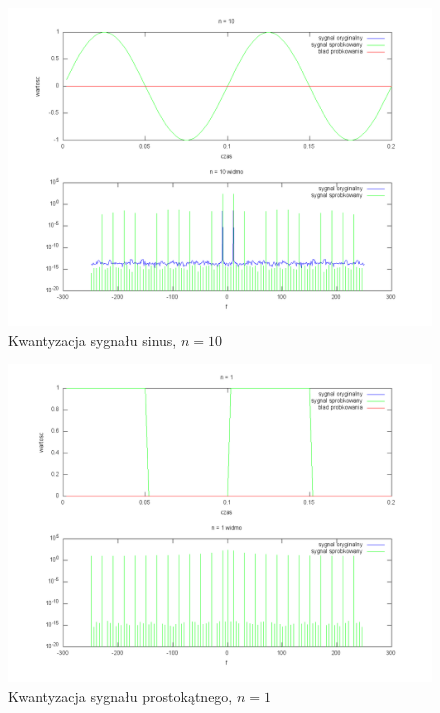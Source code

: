 \documentclass[wide,a4paper,titlepage,12pt]{mwart}
\begin{document}
	\begin{landscape}
	  \begin{figure}[htbp]
	    \begin{center}
	      \includegraphics[scale=.5]{out/kwant1-10.png}
	      \caption{\label{kwant1-10} Kwantyzacja sygnału sinus, $n=10$}
	    \end{center}
	  \end{figure}
	\end{landscape}
	
	
	\begin{landscape}
	  \begin{figure}[htbp]
	    \begin{center}
	      \includegraphics[scale=.5]{out/kwant2-1.png}
	      \caption{\label{kwant2-1} Kwantyzacja sygnału prostokątnego, $n=1$}
	    \end{center}
	  \end{figure}
	\end{landscape}
\end{document}

